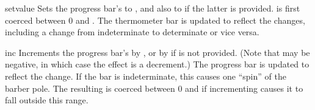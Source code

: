 \begin{methoddesc}[ProgressBar]{set}{value}
Sets the progress bar's  to , and also
 to  if the latter is provided.  
is first coerced between 0 and .  The thermometer bar
is updated to reflect the changes, including a change from
indeterminate to determinate or vice versa.
\end{methoddesc}

\begin{methoddesc}[ProgressBar]{inc}{}
Increments the progress bar's  by , or by 
if  is not provided.  (Note that  may be negative, in
which case the effect is a decrement.)  The progress bar is updated to
reflect the change.  If the bar is indeterminate, this causes one
``spin'' of the barber pole.  The resulting  is coerced
between 0 and  if incrementing causes it to fall
outside this range.
\end{methoddesc}
